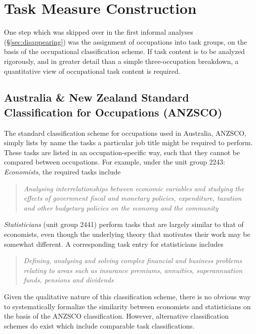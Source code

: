 \chapter{Task Measure Construction}
\label{sec:occclassify}

One step which was skipped over in the first informal analyses (\S\ref{sec:disappearing}) was the assignment of occupations into task groups, on the basis of the occupational classification scheme. If task content is to be analyzed rigorously, and in greater detail than a simple three-occupation breakdown, a quantitative view of occupational task content is required. 

\section{Australia \& New Zealand Standard Classification for Occupations (ANZSCO)}

The standard classification scheme for occupations used in Australia, ANZSCO, simply lists by name the tasks a particular job title might be required to perform. These tasks are listed in an occupation-specific way, such that they cannot be compared between occupations. For example, under the unit group 2243: {\em Economists}, the required tasks include
\begin{quote}
{\em Analysing interrelationships between economic variables and studying the effects of government fiscal and monetary policies, expenditure, taxation and other budgetary policies on the economy and the community \citep[p.185]{Trewin2006}}
\end{quote}

{\em Statisticians} (unit group 2441) perform tasks that are largely similar to that of economists, even though the underlying theory that motivates their work may be somewhat different. A corresponding task entry for statisticians includes
\begin{quote}
{\em Defining, analysing and solving complex financial and business problems relating to areas such as insurance premiums, annuities, superannuation funds, pensions and dividends \citep[p.181]{Trewin2006}}
\end{quote}
Given the qualitative nature of this classification scheme, there is no obvious way to systematically formalize the similarity between economists and statisticians on the basis of the ANZSCO classification. However, alternative classification schemes do exist which include comparable task classifications.


